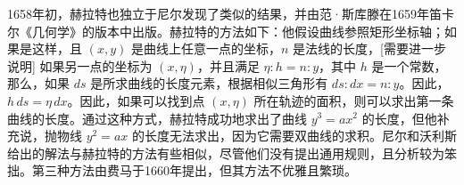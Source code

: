 1658年初，赫拉特也独立于尼尔发现了类似的结果，并由范·斯库滕在1659年笛卡尔《几何学》的版本中出版。赫拉特的方法如下：他假设曲线参照矩形坐标轴；如果是这样，且 \((x, y)\) 是曲线上任意一点的坐标，\(n\) 是法线的长度，[需要进一步说明] 如果另一点的坐标为 \((x, \eta)\)，并且满足 \(\eta : h = n : y\)，其中 \(h\) 是一个常数，那么，如果 \(ds\) 是所求曲线的长度元素，根据相似三角形有 \(ds : dx = n : y\)。因此，\(h \, ds = \eta \, dx\)。因此，如果可以找到点 \((x, \eta)\) 所在轨迹的面积，则可以求出第一条曲线的长度。通过这种方式，赫拉特成功地求出了曲线 \(y^3 = ax^2\) 的长度，但他补充说，抛物线 \(y^2 = ax\) 的长度无法求出，因为它需要双曲线的求积。尼尔和沃利斯给出的解法与赫拉特的方法有些相似，尽管他们没有提出通用规则，且分析较为笨拙。第三种方法由费马于1660年提出，但其方法不优雅且繁琐。